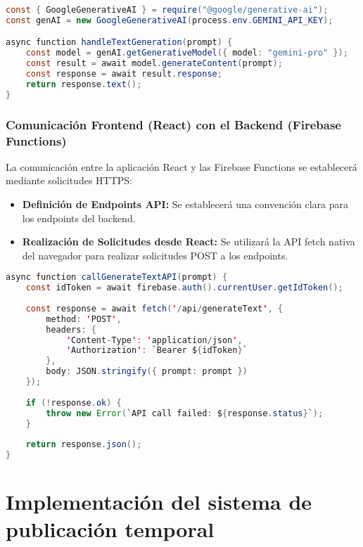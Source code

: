 \documentclass[12pt,a4paper]{report}
\begin{document}
\begin{lstlisting}[language=Java, caption=Ejemplo conceptual en una Firebase Function]
const { GoogleGenerativeAI } = require("@google/generative-ai");
const genAI = new GoogleGenerativeAI(process.env.GEMINI_API_KEY);

async function handleTextGeneration(prompt) {
    const model = genAI.getGenerativeModel({ model: "gemini-pro" });
    const result = await model.generateContent(prompt);
    const response = await result.response;
    return response.text();
}
\end{lstlisting}

\subsubsection{Comunicación Frontend (React) con el Backend (Firebase Functions)}

La comunicación entre la aplicación React y las Firebase Functions se establecerá mediante solicitudes HTTPS:

\begin{itemize}
\item \textbf{Definición de Endpoints API:} Se establecerá una convención clara para los endpoints del backend.

\item \textbf{Realización de Solicitudes desde React:} Se utilizará la API fetch nativa del navegador para realizar solicitudes POST a los endpoints.
\end{itemize}

\begin{lstlisting}[language=Java, caption=Ejemplo conceptual en React]
async function callGenerateTextAPI(prompt) {
    const idToken = await firebase.auth().currentUser.getIdToken();
    
    const response = await fetch('/api/generateText', {
        method: 'POST',
        headers: {
            'Content-Type': 'application/json',
            'Authorization': `Bearer ${idToken}`
        },
        body: JSON.stringify({ prompt: prompt })
    });
    
    if (!response.ok) {
        throw new Error(`API call failed: ${response.status}`);
    }
    
    return response.json();
}
\end{lstlisting}

\section{Implementación del sistema de publicación temporal}
\end{document}
